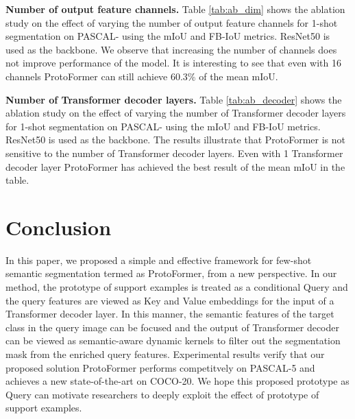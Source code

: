 \documentclass[journal]{IEEEtran}
\begin{document}
\noindent \textbf{Number of output feature channels.}
Table \ref{tab:ab_dim} shows the ablation study on the effect of varying the number of output feature channels for 1-shot segmentation on PASCAL- using the mIoU and FB-IoU metrics. ResNet50 is used as the backbone. We observe that increasing the number of channels does not improve performance of the model. It is interesting to see that even with 16 channels ProtoFormer can still achieve 60.3\% of the mean mIoU.

\noindent \textbf{Number of Transformer decoder layers.}
Table \ref{tab:ab_decoder} shows the ablation study on the effect of varying the number of Transformer decoder layers for 1-shot segmentation on PASCAL- using the mIoU and FB-IoU metrics. ResNet50 is used as the backbone. The results illustrate that ProtoFormer is not sensitive to the number of Transformer decoder layers. Even with 1 Transformer decoder layer ProtoFormer has achieved the best result of the mean mIoU in the table. 



\section{Conclusion}
In this paper, we proposed a simple and effective framework for few-shot semantic segmentation termed as ProtoFormer, from a new perspective. In our method, the prototype of support examples is treated as a conditional Query and the query features are viewed as Key and Value embeddings for the input of a Transformer decoder layer. In this manner, the semantic features of the target class in the query image can be focused and the output of Transformer decoder can be viewed as semantic-aware dynamic kernels to filter out the segmentation mask from the enriched query features. Experimental results verify that our proposed solution ProtoFormer performs competitvely on PASCAL-5 and achieves a new state-of-the-art on COCO-20. We hope this proposed prototype as Query can motivate researchers to deeply exploit the effect of prototype of support examples.





\ifCLASSOPTIONcaptionsoff
  \newpage
\fi




\end{document}
